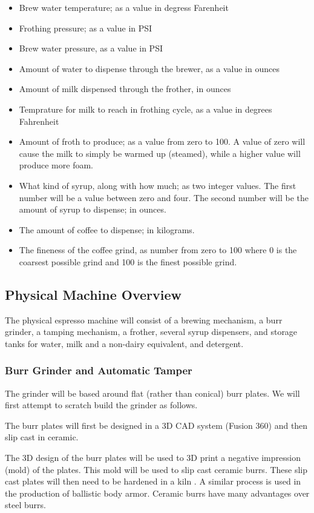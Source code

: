\documentclass[conference]{IEEEtran}
\begin{document}
\begin{itemize}
\item Brew water temperature; as a value in degress Farenheit
\item Frothing pressure; as a value in PSI
\item Brew water pressure, as a value in PSI
\item Amount of water to dispense through the brewer, as a value in ounces
\item Amount of milk dispensed through the frother, in ounces
\item Temprature for milk to reach in frothing cycle, as a value in degrees Fahrenheit
\item Amount of froth to produce; as a value from zero to 100. A value of zero will cause the milk
  to simply be warmed up (steamed), while a higher value will produce more foam.
\item What kind of syrup, along with how much; as two integer values. The first number will be a
  value between zero and four. The second number will be the amount of syrup to dispense; in ounces.
\item The amount of coffee to dispense; in kilograms.
\item The fineness of the coffee grind, as number from zero to 100 where 0 is the coarsest possible
  grind and 100 is the finest possible grind.
\end{itemize}

\subsection{Physical Machine Overview}

The physical espresso machine will consist of a brewing mechanism, a
burr grinder, a tamping mechanism, a frother, several syrup dispensers, and
storage tanks for water, milk and a non-dairy equivalent, and detergent.

\subsubsection{Burr Grinder and Automatic Tamper}
The grinder will be based around flat (rather than conical) burr plates. We will first
attempt to scratch build the grinder as follows.

The burr plates will first be designed in a 3D CAD system (Fusion 360) and then slip cast
in ceramic.

The 3D design of the burr plates will be used to 3D print a negative impression (mold) of the plates.
This mold will be used to slip cast
ceramic burrs. These slip cast plates will then need
to be hardened in a kiln \cite{slip}. A similar process is used in the
production of ballistic body armor. Ceramic burrs have many advantages over steel burrs.
\end{document}
